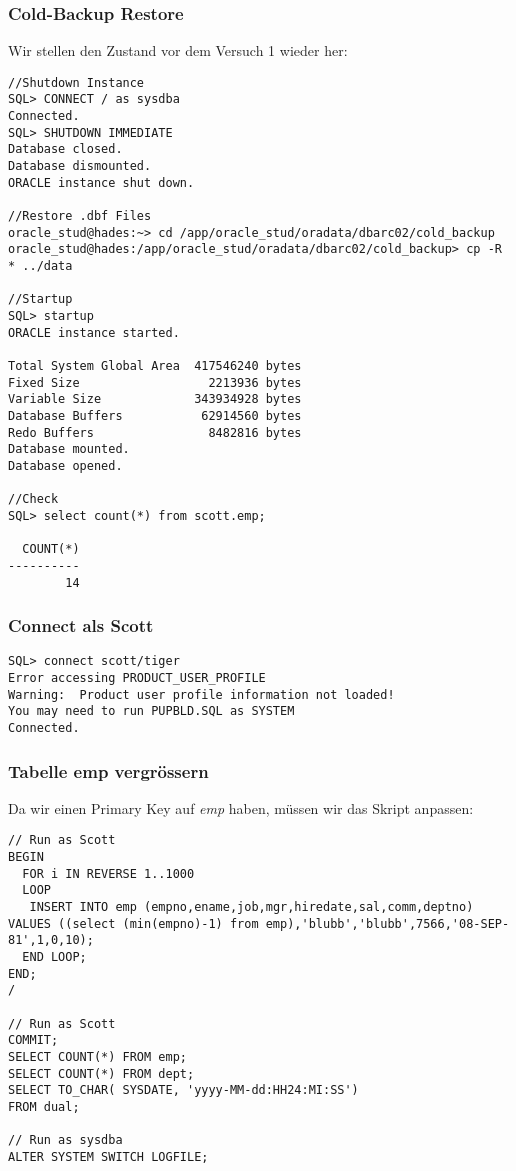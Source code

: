 \documentclass[11pt,a4paper,parskip=half]{scrartcl}
\begin{document}
\subsubsection{Cold-Backup Restore}
Wir stellen den Zustand vor dem Versuch 1 wieder her:
\begin{lstlisting}
//Shutdown Instance
SQL> CONNECT / as sysdba
Connected.
SQL> SHUTDOWN IMMEDIATE
Database closed.
Database dismounted.
ORACLE instance shut down.

//Restore .dbf Files
oracle_stud@hades:~> cd /app/oracle_stud/oradata/dbarc02/cold_backup
oracle_stud@hades:/app/oracle_stud/oradata/dbarc02/cold_backup> cp -R * ../data

//Startup
SQL> startup
ORACLE instance started.

Total System Global Area  417546240 bytes
Fixed Size                  2213936 bytes
Variable Size             343934928 bytes
Database Buffers           62914560 bytes
Redo Buffers                8482816 bytes
Database mounted.
Database opened.

//Check
SQL> select count(*) from scott.emp;

  COUNT(*)
----------
        14
\end{lstlisting}

\subsubsection{Connect als Scott}
\begin{lstlisting}
SQL> connect scott/tiger
Error accessing PRODUCT_USER_PROFILE
Warning:  Product user profile information not loaded!
You may need to run PUPBLD.SQL as SYSTEM
Connected.
\end{lstlisting}

\subsubsection{Tabelle emp vergrössern}
Da wir einen Primary Key auf \emph{emp} haben, müssen wir das Skript anpassen:
\begin{lstlisting}
// Run as Scott
BEGIN
  FOR i IN REVERSE 1..1000 
  LOOP
   INSERT INTO emp (empno,ename,job,mgr,hiredate,sal,comm,deptno) VALUES ((select (min(empno)-1) from emp),'blubb','blubb',7566,'08-SEP-81',1,0,10);
  END LOOP;
END;
/

// Run as Scott
COMMIT;
SELECT COUNT(*) FROM emp;
SELECT COUNT(*) FROM dept;
SELECT TO_CHAR( SYSDATE, 'yyyy-MM-dd:HH24:MI:SS')
FROM dual;

// Run as sysdba
ALTER SYSTEM SWITCH LOGFILE;
\end{lstlisting}
\end{document}
